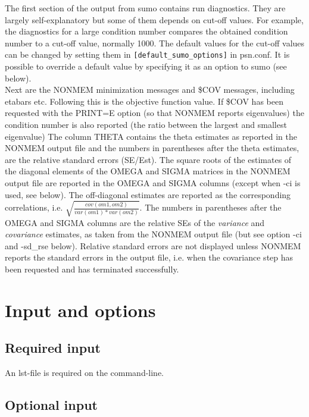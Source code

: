 The first section of the output from sumo contains run diagnostics. They are largely self-explanatory but some of them depends on cut-off values. For example, the diagnostics for a large condition number compares the obtained condition number to a cut-off value, normally 1000. The default values for the cut-off values can be changed by setting them in 
\verb|[default_sumo_options]| in psn.conf. It is possible to override a default value by specifying it as an option to sumo (see below).
\\ 
Next are the NONMEM minimization messages and \$COV messages, including etabars etc. Following this is the objective function value. If \$COV has been requested with the PRINT=E option (so that NONMEM reports eigenvalues) the condition number is also reported (the ratio between the largest and smallest eigenvalue)
The column THETA contains the theta estimates as reported in the NONMEM output file and the numbers in parentheses after the theta estimates, are the relative standard errors (SE/Est). The square roots of the estimates of the diagonal elements of the OMEGA and SIGMA matrices in the NONMEM output file are reported in the OMEGA and SIGMA columns (except when -ci is used, see below). The off-diagonal estimates are reported as the corresponding correlations, i.e. 
$\sqrt{\frac{cov(om1,om2)}{var(om1)*var(om2)}}$. 
The numbers in parentheses after the OMEGA and SIGMA columns are the relative SEs of the \emph{variance} and \emph{covariance} estimates, as taken from the NONMEM output file
(but see option -ci and -sd\_rse below).
Relative standard errors are not displayed unless NONMEM reports the standard errors in the output file, i.e. when the covariance step has been requested and has terminated successfully.


\section{Input and options}

\subsection{Required input}
An lst-file is required on the command-line.

\subsection{Optional input}

